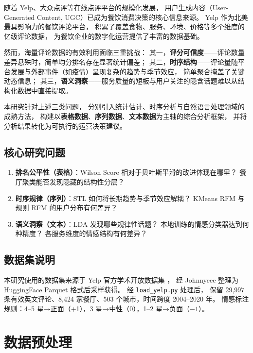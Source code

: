 \documentclass[12pt, a4paper]{article}
\begin{document}
随着 Yelp、大众点评等在线点评平台的规模化发展，
用户生成内容（User-Generated Content, UGC）已成为餐饮消费决策的核心信息来源。
Yelp 作为北美最具影响力的餐饮评论平台，
积累了覆盖食物、服务、环境、价格等多个维度的亿级评论数据，
为餐饮企业的数字化运营提供了丰富的数据基础。

然而，海量评论数据的有效利用面临三重挑战：
其一，\textbf{评分可信度}——评论数量差异悬殊时，简单均分排名存在显著统计偏差；
其二，\textbf{时序结构}——评论量随平台发展与外部事件（如疫情）呈现复杂的趋势与季节效应，
简单聚合掩盖了关键动态信息；
其三，\textbf{语义洞察}——服务质量的短板与用户关注的隐含话题难以从结构化数据中直接提取。

本研究针对上述三类问题，
分别引入统计估计、时序分析与自然语言处理领域的成熟方法，
构建以\textbf{表格数据}、\textbf{序列数据}、\textbf{文本数据}为主轴的综合分析框架，
并将分析结果转化为可执行的运营决策建议。

\subsection{核心研究问题}

\begin{enumerate}[leftmargin=2em]
  \item \textbf{排名公平性（表格）}：Wilson Score 相对于贝叶斯平滑的改进体现在哪里？
        餐厅聚类能否发现隐藏的结构性分层？
  \item \textbf{时序规律（序列）}：STL 如何将长期趋势与季节效应解耦？
        KMeans RFM 与规则 RFM 的用户分布有何差异？
  \item \textbf{语义洞察（文本）}：LDA 发现哪些规律性话题？
        本地训练的情感分类器达到何种精度？
        各服务维度的情感结构有何差异？
\end{enumerate}

\subsection{数据集说明}

本研究使用的数据集来源于 Yelp 官方学术开放数据集 \cite{yelp_academic}，
经 Johnnyeee \cite{yelp_dataset} 整理为 HuggingFace Parquet 格式后采样获得。
经 \texttt{load\_yelp.py} 处理后，
保留 29,997 条有效英文评论、8,424 家餐厅、503 个城市，时间跨度 2004--2020 年。
情感标注规则：4--5 星→正面（+1），3 星→中性（0），1--2 星→负面（$-1$）。

\section{数据预处理}
\end{document}
